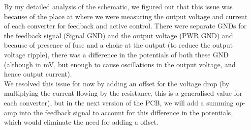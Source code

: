 \begin{itemize}
    By my detailed analysis of the schematic, we figured out that this issue was because of the place at where we were measuring the output voltage and current of each converter for feedback and active control. There were separate GNDs for the feedback signal (Signal GND) and the output voltage (PWR GND) and because of presence of fuse and a choke at the output (to reduce the output voltage ripple), there was a difference in the potentials of both these GND (although in mV, but enough to cause oscillations in the output voltage, and hence output current).\\
    We resolved this issue for now by adding an offset for the voltage drop (by multiplying the current flowing by the resistance, this is a generalised value for each converter), but in the next version of the PCB, we will add a summing op-amp into the feedback signal to account for this difference in the potentials, which would eliminate the need for adding a offset.
\end{itemize}